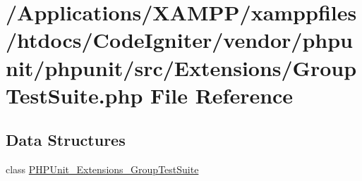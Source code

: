 \hypertarget{_group_test_suite_8php}{}\section{/\+Applications/\+X\+A\+M\+P\+P/xamppfiles/htdocs/\+Code\+Igniter/vendor/phpunit/phpunit/src/\+Extensions/\+Group\+Test\+Suite.php File Reference}
\label{_group_test_suite_8php}
\subsection*{Data Structures}
\begin{DoxyCompactItemize}
\item 
class \mbox{\hyperlink{class_p_h_p_unit___extensions___group_test_suite}{P\+H\+P\+Unit\+\_\+\+Extensions\+\_\+\+Group\+Test\+Suite}}
\end{DoxyCompactItemize}
